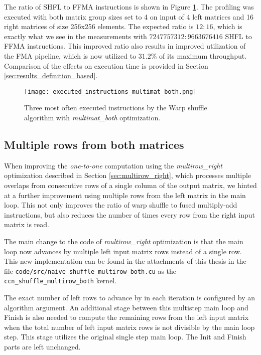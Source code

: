 The ratio of SHFL to FFMA instructions is shown in Figure \ref{fig:multimat_both_executed_instructions}. The profiling was executed with both matrix group sizes set to 4 on input of 4 left matrices and 16 right matrices of size 256x256 elements. The expected ratio is $12 : 16$, which is exactly what we see in the measurements with $7 247 757 312 : 9 663 676 416$ SHFL to FFMA instructions. This improved ratio also results in improved utilization of the FMA pipeline, which is now utilized to
$31.2\%$ of its maximum throughput. Comparison of the effects on execution time is provided in Section \ref{sec:results_definition_based}.

\begin{figure}
	\centering
	\texttt{[image: executed\_instructions\_multimat\_both.png]}
	\caption{Three most often executed instructions by the Warp shuffle algorithm with \textit{multimat\_both} optimization.}
	\label{fig:multimat_both_executed_instructions}
\end{figure}


\subsection{Multiple rows from both matrices}
\label{sec:multirow_both}

When improving the \textit{one-to-one} computation using the \textit{multirow\_right} optimization described in Section \ref{sec:multirow_right}, which processes multiple overlaps from consecutive rows of a single column of the output matrix, we hinted at a further improvement using multiple rows from the left matrix in the main loop. This not only improves the ratio of warp shuffle to fused multiply-add instructions, but also reduces the number of times every row from the right input matrix is read. 

The main change to the code of \textit{multirow\_right} optimization is that the main loop now advances by multiple left input matrix rows instead of a single row. This new implementation can be found in the attachments of this thesis in the file \texttt{code/src/naive\_shuffle\_multirow\_both.cu} as the \texttt{ccn\_shuffle\_multirow\_both} kernel.

The exact number of left rows to advance by in each iteration is configured by an algorithm argument. An additional stage between this multistep main loop and Finish is also needed to compute the remaining rows from the left input matrix when the total number of left input matrix rows is not divisible by the main loop step. This stage utilizes the original single step main loop. The Init and Finish parts are left unchanged.



